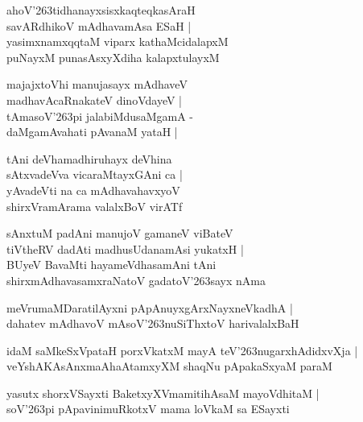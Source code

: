\documentclass[twoside,12pt,openright]{book}
\def\S{\char'263}
\newcounter{shloka}[chapter]
\begin{document}
\begin{shloka}%
ahoV\S tidhanayxsisxkaqteqkasAraH \\
savARdhikoV mAdhavamAsa ESaH |\\
yasimxnamxqqtaM viparx kathaMcidalapxM \\
puNayxM punasAsxyXdiha kalapxtulayxM 
\end{shloka}

\begin{shloka}%
majajxtoVhi manujasayx mAdhaveV \\
madhavAcaRnakateV dinoVdayeV |\\
tAmasoV\S pi jalabiMdusaMgamA -\\
daMgamAvahati pAvanaM yataH |\\
\end{shloka}

\begin{shloka}%
tAni deVhamadhiruhayx deVhina \\
sAtxvadeVva vicaraMtayxGAni ca |\\
yAvadeVti na ca mAdhavahavxyoV \\
shirxVramArama valalxBoV virATf
\end{shloka}

\begin{shloka}%
sAnxtuM padAni manujoV gamaneV viBateV \\
tiVtheRV dadAti madhusUdanamAsi yukatxH |\\
BUyeV BavaMti hayameVdhasamAni tAni \\
shirxmAdhavasamxraNatoV gadatoV\S sayx nAma 
\end{shloka}

\begin{shloka}%
meVrumaMDaratilAyxni pApAnuyxgArxNayxneVkadhA |\\
dahatev mAdhavoV mAsoV\S nuSiThxtoV harivalalxBaH 
\end{shloka}

\begin{shloka}%
idaM saMkeSxVpataH porxVkatxM mayA teV\S nugarxhAdidxvXja |\\
veYshAKAsAnxmaAhaAtamxyXM shaqNu pApakaSxyaM paraM 
\end{shloka}

\begin{shloka}%
yasutx shorxVSayxti BaketxyXVmamitihAsaM mayoVdhitaM |\\
soV\S pi pApavinimuRkotxV mama loVkaM sa ESayxti
\end{shloka}
\end{document}
